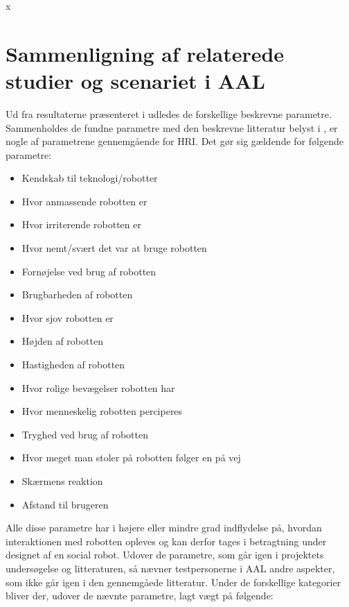 x\section{Sammenligning af relaterede studier og scenariet i AAL}
\label{ParametreTidligereStudier}
%
Ud fra resultaterne præsenteret i  udledes de forskellige beskrevne parametre. Sammenholdes de fundne parametre med den beskrevne litteratur belyst i , er nogle af parametrene gennemgående for HRI. Det gør sig gældende for følgende parametre:\blankline
%
\begin{multicols}{2}
	\begin{itemize}
		\item Kendskab til teknologi/robotter
		\item Hvor anmassende robotten er
		\item Hvor irriterende robotten er
		\item Hvor nemt/svært det var at bruge robotten
		\item Fornøjelse ved brug af robotten
		\item Brugbarheden af robotten
		\item Hvor sjov robotten er
		\item Højden af robotten
		\item Hastigheden af robotten
		\item Hvor rolige bevægelser robotten har
		\item Hvor menneskelig robotten perciperes
		\item Tryghed ved brug af robotten
		\item Hvor meget man stoler på robotten følger en på vej
		\item Skærmens reaktion
		\item Afstand til brugeren
	\end{itemize}
\end{multicols}
\noindent
%
Alle disse parametre har i højere eller mindre grad indflydelse på, hvordan interaktionen med robotten opleves og kan derfor tages i betragtning under designet af en social robot. \blankline
Udover de parametre, som går igen i projektets undersøgelse og litteraturen, så nævner testpersonerne i AAL andre aspekter, som ikke går igen i den gennemgåede litteratur. Under de forskellige kategorier bliver der, udover de nævnte parametre, lagt vægt på følgende:
%
